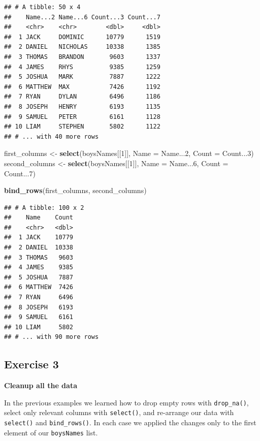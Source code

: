 \documentclass[
]{book}
\newenvironment{Shaded}{\begin{snugshade}}{\end{snugshade}}
\newcommand{\DataTypeTok}[1]{\textcolor[rgb]{0.13,0.29,0.53}{#1}}
\newcommand{\DecValTok}[1]{\textcolor[rgb]{0.00,0.00,0.81}{#1}}
\newcommand{\KeywordTok}[1]{\textcolor[rgb]{0.13,0.29,0.53}{\textbf{#1}}}
\newcommand{\NormalTok}[1]{#1}
\newcommand{\StringTok}[1]{\textcolor[rgb]{0.31,0.60,0.02}{#1}}
\begin{document}
\begin{verbatim}
## # A tibble: 50 x 4
##    Name...2 Name...6 Count...3 Count...7
##    <chr>    <chr>        <dbl>     <dbl>
##  1 JACK     DOMINIC      10779      1519
##  2 DANIEL   NICHOLAS     10338      1385
##  3 THOMAS   BRANDON       9603      1337
##  4 JAMES    RHYS          9385      1259
##  5 JOSHUA   MARK          7887      1222
##  6 MATTHEW  MAX           7426      1192
##  7 RYAN     DYLAN         6496      1186
##  8 JOSEPH   HENRY         6193      1135
##  9 SAMUEL   PETER         6161      1128
## 10 LIAM     STEPHEN       5802      1122
## # ... with 40 more rows
\end{verbatim}

\begin{Shaded}
\begin{Highlighting}[]
\NormalTok{first\_columns \textless{}{-}}\StringTok{ }\KeywordTok{select}\NormalTok{(boysNames[[}\DecValTok{1}\NormalTok{]], }\DataTypeTok{Name =}\NormalTok{ Name...}\DecValTok{2}\NormalTok{, }\DataTypeTok{Count =}\NormalTok{ Count...}\DecValTok{3}\NormalTok{)}
\NormalTok{second\_columns \textless{}{-}}\StringTok{ }\KeywordTok{select}\NormalTok{(boysNames[[}\DecValTok{1}\NormalTok{]], }\DataTypeTok{Name =}\NormalTok{ Name...}\DecValTok{6}\NormalTok{, }\DataTypeTok{Count =}\NormalTok{ Count...}\DecValTok{7}\NormalTok{)}

\KeywordTok{bind\_rows}\NormalTok{(first\_columns, second\_columns)}
\end{Highlighting}
\end{Shaded}

\begin{verbatim}
## # A tibble: 100 x 2
##    Name    Count
##    <chr>   <dbl>
##  1 JACK    10779
##  2 DANIEL  10338
##  3 THOMAS   9603
##  4 JAMES    9385
##  5 JOSHUA   7887
##  6 MATTHEW  7426
##  7 RYAN     6496
##  8 JOSEPH   6193
##  9 SAMUEL   6161
## 10 LIAM     5802
## # ... with 90 more rows
\end{verbatim}

\hypertarget{exercise-3-3}{%
\subsection{Exercise 3}\label{exercise-3-3}}

\textbf{Cleanup all the data}

In the previous examples we learned how to drop empty rows with
\texttt{drop\_na()}, select only relevant columns with \texttt{select()}, and re-arrange
our data with \texttt{select()} and \texttt{bind\_rows()}. In each case we applied the
changes only to the first element of our \texttt{boysNames} list.
\end{document}
